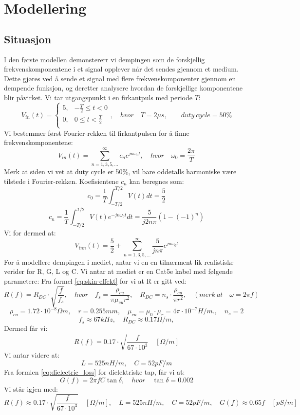 \section{Modellering}
\subsection{Situasjon}
I den første modellen demonstererr vi dempingen som de forskjellig frekvenskomponentene i et signal opplever når det sendes gjennom et medium. Dette gjøres ved å sende et signal med flere frekvenskomponenter gjennom en dempende funksjon, og deretter analysere hvordan de forskjellige komponentene blir påvirket.
Vi tar utgangspunkt i en firkantpuls med periode $T$:
\[
    V_{in}(t) = \begin{cases}
        5, & -\frac{T}{2} \leq t < 0 \\
        0, & 0 \leq t < \frac{T}{2} \\
    \end{cases}, \quad hvor \quad T = 2 \mu s,\qquad duty\ cycle = 50\%
\]
Vi bestemmer først Fourier-rekken til firkantpulsen for å finne frekvenskomponentene:
\[
    V_{in}(t) = \sum_{n=1,3,5,...}^{\infty} c_n e^{j n \omega_0 t}, \quad hvor \quad \omega_0 = \frac{2\pi}{T}
\]
Merk at siden vi vet at duty cycle er 50\%, vil bare oddetalls harmoniske være tilstede i Fourier-rekken.
Koefisientene $c_n$ kan beregnes som:
\[
    c_0 = \frac{1}{T} \int_{-T/2}^{T/2} V(t) dt = \frac{5}{2}
\]
\[
    c_n = \frac{1}{T} \int_{-T/2}^{T/2} V(t) e^{-j n \omega_0 t} dt =  \frac{5}{j 2 n \pi} (1 - (-1)^n)
\]
Vi for dermed at:
\[
    V_{inn}(t) = \frac{5}{2} + \sum_{n=1,3,5,...}^{\infty} \frac{5}{j n \pi} e^{j n \omega_0 t}
\]
For å modellere dempingen i mediet, antar vi en en tilnærment lik realistiske verider for R, G, L og C.
Vi antar at mediet er en Cat5e kabel med følgende parametere:
Fra formel \eqref{eq:skin-effekt} for vi at R er gitt ved:
\[
    R(f) = R_{DC} \cdot \sqrt{\frac{f}{f_{s}}}, \quad hvor \quad f_{s} = \frac{\rho_{cu}}{\pi \mu_{cu} r^2}, \quad R_{DC} = n_s \cdot \frac{\rho_{cu}}{\pi r^2}, \quad (merk\ at \quad \omega = 2\pi f)
\]
\[
    \rho_{cu} = 1.72 \cdot 10^{-8} \Omega m, \quad r = 0.255 mm, \quad \mu_{cu} = \mu_0 \cdot \mu_r = 4\pi \cdot 10^{-7} H/m., \quad n_s = 2
\]
\[
    f_s \approx 67kHz, \quad R_{DC} \approx 0.17 \Omega/m,
\]
Dermed får vi:
\[
    R(f) = 0.17 \cdot \sqrt{\frac{f}{67 \cdot 10^3}} \quad [\Omega/m]
\]
Vi antar videre at:
\[
    L = 525 nH/m, \quad C = 52 pF/m
\]
Fra formlen \eqref{eq:dielectric_loss} for dielektriske tap, får vi at:
\[
    G(f) = 2\pi f C \tan \delta, \quad hvor \quad \tan \delta = 0.002
\]
\clearpage
\noindent Vi står igjen med:
\[
    R(f) \approx 0.17 \cdot \sqrt{\frac{f}{67 \cdot 10^3}} \quad [\Omega/m], \quad L = 525 nH/m, \quad C = 52 pF/m, \quad G(f) \approx 0.65f \quad [pS/m]
\]

